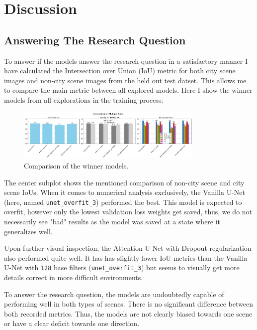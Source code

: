 \chapter{Discussion}

\section{Answering The Research Question}
To answer if the models answer the research question in a satisfactory manner I have calculated the Intersection over Union (IoU) metric for both city scene images and non-city scene images from the held out test datset. This allows me to compare the main metric between all explored models. Here I show the winner models from all explorations in the training process:

\begin{figure}[h] 
    \centering 
    \includegraphics[width=0.8\textwidth]{figures/winners_comparison.png} 
    \caption{Comparison of the winner models.} 
    \label{fig:winners_comparison} 
\end{figure}

The center subplot shows the mentioned comparison of non-city scene and city scene IoUs. When it comes to numerical analysis exclusively, the Vanilla U-Net (here, named \texttt{unet\_overfit\_3}) performed the best. This model is expected to overfit, however only the lowest validation loss weights get saved, thus, we do not necessarily see "bad" results as the model was saved at a state where it generalizes well. 

Upon further visual inspection, the Attention U-Net with Dropout regularization also performed quite well. It has has slightly lower IoU metrics than the Vanilla U-Net with \texttt{128} base filters (\texttt{unet\_overfit\_3}) but seems to visually get more details correct in more difficult environments.

To answer the research question, the models are undoubtedly capable of performing well in both types of scenes. There is no significant difference between both recorded metrics. Thus, the models are not clearly biased towards one scene or have a clear deficit towards one direction.

